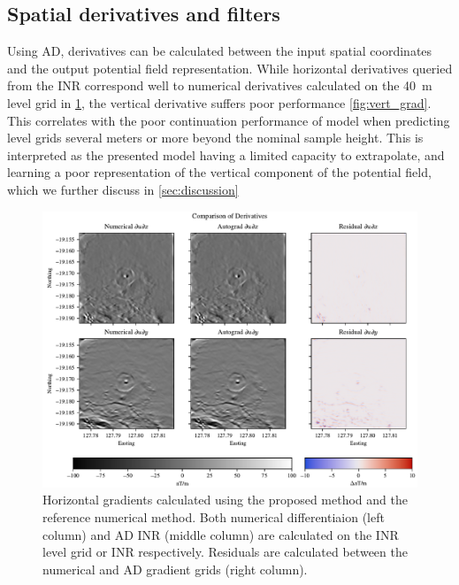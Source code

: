 \documentclass[manuscript.tex]{subfiles}
\begin{document}



\subsection{Spatial derivatives and filters}
Using AD, derivatives can be calculated between the input spatial coordinates and the output potential field representation.
While horizontal derivatives queried from the INR correspond well to numerical derivatives calculated on the \SI{40}{\m} level grid in \cref{fig:hori_grad}, the vertical derivative suffers poor performance \cref{fig:vert_grad}.
This correlates with the poor continuation performance of model when predicting level grids several meters or more beyond the nominal sample height.
This is interpreted as the presented model having a limited capacity to extrapolate, and learning a poor representation of the vertical component of the potential field, which we further discuss in \cref{sec:discussion}

\begin{figure}[hbt]
    \centering{}
    \includegraphics[width=1.0\linewidth]{fig/p3/P864_dh_comparison.pdf}
    \caption[Horizontal derivatives]{Horizontal gradients calculated using the proposed method and the reference numerical method.
        Both numerical differentiaion (left column) and AD INR (middle column) are calculated on the INR level grid or INR respectively.
        Residuals are calculated between the numerical and AD gradient grids (right column).}
    \label{fig:hori_grad}
\end{figure}
\end{document}
